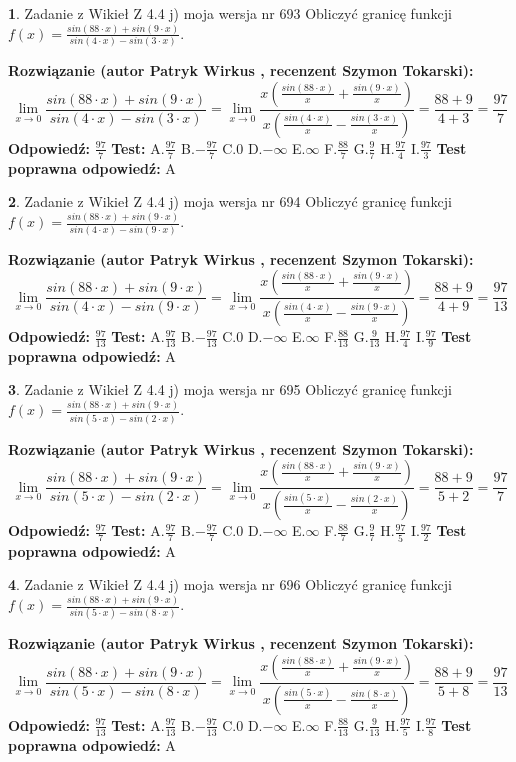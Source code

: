 \documentclass[12pt, a4paper]{article}
\theoremstyle{definition} %
\newtheorem{zad}{}
\newcommand{\zadStart}[1]{\begin{zad}#1\newline}
\newcommand{\zadStop}{\end{zad}}
\newcommand{\rozwStart}[2]{\noindent \textbf{Rozwiązanie (autor #1 , recenzent #2): }\newline}
\newcommand{\rozwStop}{\newline}
\newcommand{\odpStart}{\noindent \textbf{Odpowiedź:}\newline}
\newcommand{\odpStop}{\newline}
\newcommand{\testStart}{\noindent \textbf{Test:}\newline}
\newcommand{\testStop}{\newline}
\newcommand{\kluczStart}{\noindent \textbf{Test poprawna odpowiedź:}\newline}
\newcommand{\kluczStop}{\newline}
\begin{document}
\zadStart{Zadanie z Wikieł Z 4.4 j) moja wersja nr 693}
Obliczyć granicę funkcji $f(x)=\frac{sin(88\cdot x) +sin(9\cdot x)}{sin(4\cdot x) -sin(3\cdot x)}$.
\zadStop
\rozwStart{Patryk Wirkus}{Szymon Tokarski}
$$\lim\limits_{x\to 0}\frac{sin(88\cdot x) +sin(9\cdot x)}{sin(4\cdot x) -sin(3\cdot x)}=\lim\limits_{x\to 0}\frac{x(\frac{sin(88\cdot x)}{x}+\frac{sin(9\cdot x)}{x})}{x(\frac{sin(4\cdot x)}{x}-\frac{sin(3\cdot x)}{x})}=\frac{88+9}{4+3} = \frac{97}{7}$$
\rozwStop
\odpStart
$\frac{97}{7}$
\odpStop
\testStart
A.$\frac{97}{7}$
B.$-\frac{97}{7}$
C.$0$
D.$-\infty$
E.$\infty$
F.$\frac{88}{7}$
G.$\frac{9}{7}$
H.$\frac{97}{4}$
I.$\frac{97}{3}$
\testStop
\kluczStart
A
\kluczStop



\zadStart{Zadanie z Wikieł Z 4.4 j) moja wersja nr 694}
Obliczyć granicę funkcji $f(x)=\frac{sin(88\cdot x) +sin(9\cdot x)}{sin(4\cdot x) -sin(9\cdot x)}$.
\zadStop
\rozwStart{Patryk Wirkus}{Szymon Tokarski}
$$\lim\limits_{x\to 0}\frac{sin(88\cdot x) +sin(9\cdot x)}{sin(4\cdot x) -sin(9\cdot x)}=\lim\limits_{x\to 0}\frac{x(\frac{sin(88\cdot x)}{x}+\frac{sin(9\cdot x)}{x})}{x(\frac{sin(4\cdot x)}{x}-\frac{sin(9\cdot x)}{x})}=\frac{88+9}{4+9} = \frac{97}{13}$$
\rozwStop
\odpStart
$\frac{97}{13}$
\odpStop
\testStart
A.$\frac{97}{13}$
B.$-\frac{97}{13}$
C.$0$
D.$-\infty$
E.$\infty$
F.$\frac{88}{13}$
G.$\frac{9}{13}$
H.$\frac{97}{4}$
I.$\frac{97}{9}$
\testStop
\kluczStart
A
\kluczStop



\zadStart{Zadanie z Wikieł Z 4.4 j) moja wersja nr 695}
Obliczyć granicę funkcji $f(x)=\frac{sin(88\cdot x) +sin(9\cdot x)}{sin(5\cdot x) -sin(2\cdot x)}$.
\zadStop
\rozwStart{Patryk Wirkus}{Szymon Tokarski}
$$\lim\limits_{x\to 0}\frac{sin(88\cdot x) +sin(9\cdot x)}{sin(5\cdot x) -sin(2\cdot x)}=\lim\limits_{x\to 0}\frac{x(\frac{sin(88\cdot x)}{x}+\frac{sin(9\cdot x)}{x})}{x(\frac{sin(5\cdot x)}{x}-\frac{sin(2\cdot x)}{x})}=\frac{88+9}{5+2} = \frac{97}{7}$$
\rozwStop
\odpStart
$\frac{97}{7}$
\odpStop
\testStart
A.$\frac{97}{7}$
B.$-\frac{97}{7}$
C.$0$
D.$-\infty$
E.$\infty$
F.$\frac{88}{7}$
G.$\frac{9}{7}$
H.$\frac{97}{5}$
I.$\frac{97}{2}$
\testStop
\kluczStart
A
\kluczStop



\zadStart{Zadanie z Wikieł Z 4.4 j) moja wersja nr 696}
Obliczyć granicę funkcji $f(x)=\frac{sin(88\cdot x) +sin(9\cdot x)}{sin(5\cdot x) -sin(8\cdot x)}$.
\zadStop
\rozwStart{Patryk Wirkus}{Szymon Tokarski}
$$\lim\limits_{x\to 0}\frac{sin(88\cdot x) +sin(9\cdot x)}{sin(5\cdot x) -sin(8\cdot x)}=\lim\limits_{x\to 0}\frac{x(\frac{sin(88\cdot x)}{x}+\frac{sin(9\cdot x)}{x})}{x(\frac{sin(5\cdot x)}{x}-\frac{sin(8\cdot x)}{x})}=\frac{88+9}{5+8} = \frac{97}{13}$$
\rozwStop
\odpStart
$\frac{97}{13}$
\odpStop
\testStart
A.$\frac{97}{13}$
B.$-\frac{97}{13}$
C.$0$
D.$-\infty$
E.$\infty$
F.$\frac{88}{13}$
G.$\frac{9}{13}$
H.$\frac{97}{5}$
I.$\frac{97}{8}$
\testStop
\kluczStart
A
\kluczStop
\end{document}
